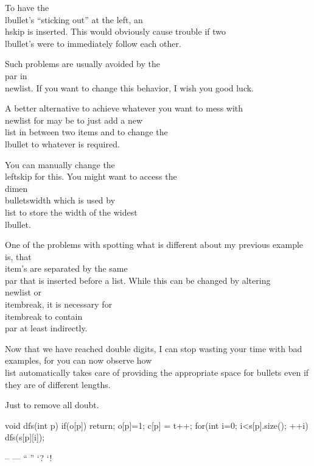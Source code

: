 {{  \item{To have the {\cs\\lbullet}'s ``sticking out'' at the left, an {\cs\\hskip} is inserted. This would obviously cause trouble if two {\cs\\lbullet}'s were to immediately follow each other.}
  \item{Such problems are usually avoided by the {\cs\\par} in {\cs\\newlist}. If you want to change this behavior, I wish you good luck.}
  \item{A better alternative to achieve whatever you want to mess with {\cs\\newlist} for may be to just add a new {\cs\\list} in between two items and to change the {\cs\\lbullet} to whatever is required.}
  \item{You can manually change the {\cs\\leftskip} for this. You might want to access the {\cs\\dimen} {\cs\\bulletswidth} which is used by {\cs\\list} to store the width of the widest {\cs\\lbullet}.}
  {\advance\leftskip\bulletswidth{}}
  \item{One of the problems with spotting what is different about my previous example is, that {\cs\\item}'s are separated by the same {\cs\\par} that is inserted before a list. While this can be changed by altering {\cs\\newlist} or {\cs\\itembreak}, it is necessary for {\cs\\itembreak} to contain {\cs\\par} at least indirectly.}
  \item{Now that we have reached double digits, I can stop wasting your time with bad examples, for you can now observe how {\cs\\list} automatically takes care of providing the appropriate space for bullets even if they are of different lengths.}
  {\def\lbullet{$\circ\quad$}
  \item{Just to remove all doubt.}}}


\verbatim
void dfs(int p){%
		if(o[p]) return;%
		o[p]=1;%
		c[p] = t++;%
		for(int i=0; i<s[p].size(); ++i){%
				dfs(s[p][i]);%
			}%
	}%

-- --- `` '' `? `!%
\endverbatim
  }
